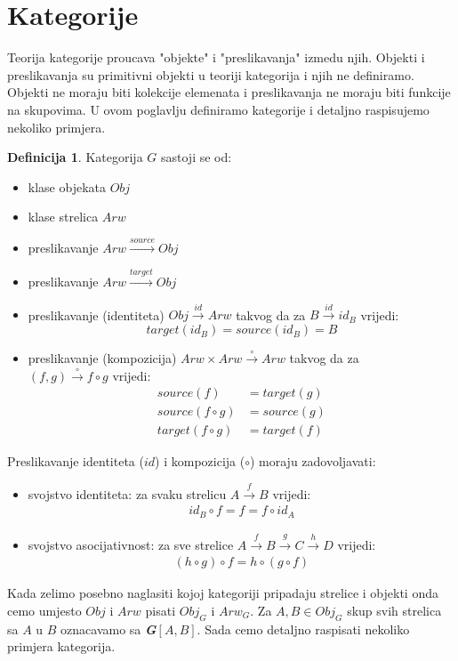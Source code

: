 \documentclass[11pt]{article}
\newcommand{\category}[1]{\textbf{\emph{#1}}}
\theoremstyle{definition}
\newtheorem{definition}{Definicija}
\begin{document}
  \section{Kategorije}
  Teorija kategorije proucava "objekte" i "preslikavanja" izmedu
  njih. Objekti i preslikavanja su primitivni objekti u teoriji kategorija i
  njih ne definiramo. Objekti ne moraju biti kolekcije elemenata i
  preslikavanja ne moraju biti funkcije na skupovima.
  U ovom poglavlju definiramo kategorije i detaljno raspisujemo nekoliko
  primjera.
  \begin{definition}
    Kategorija $G$ sastoji se od:
    \begin{itemize}
      \item klase objekata $Obj$
      \item klase strelica $Arw$
      \item preslikavanje $Arw \xrightarrow{source} Obj$
      \item preslikavanje $Arw \xrightarrow{target} Obj$
      \item preslikavanje (identiteta) $Obj \xrightarrow{id} Arw$ takvog da
      za $B \xrightarrow{id} id_B$ vrijedi:
        \begin{equation}
          target(id_B) = source(id_B) = B
        \end{equation}
      \item preslikavanje (kompozicija) $Arw \times Arw \xrightarrow{\circ}
      Arw$ takvog da za \\ $(f, g) \xrightarrow{\circ} f \circ g$ vrijedi:
        \begin{align}
          source(f) &= target(g) \\
          source(f \circ g) &= source(g) \\
          target(f \circ g) &= target(f)
        \end{align}
    \end{itemize}
    Preslikavanje identiteta ($id$) i kompozicija ($\circ$) moraju
    zadovoljavati:
    \begin{itemize}
      \item svojstvo identiteta: za svaku strelicu $A \xrightarrow{f} B$ vrijedi:
        \begin{align}
          id_B \circ f = f = f \circ id_A
        \end{align}
      \item svojstvo asocijativnost: za sve strelice $A \xrightarrow{f} B
      \xrightarrow{g} C \xrightarrow{h} D$ vrijedi:
        \begin{align} \label{def:kat_assoc}
          (h \circ g) \circ f = h \circ (g \circ f)
        \end{align}
    \end{itemize}
  \end{definition}
  Kada zelimo posebno naglasiti kojoj kategoriji pripadaju strelice i objekti
  onda cemo umjesto $Obj$ i $Arw$ pisati $Obj_G$ i $Arw_G$.
  Za $A, B \in Obj_G$ skup svih strelica sa $A$ u $B$ oznacavamo sa
  \category{G}$[A, B]$.
  Sada cemo detaljno raspisati nekoliko primjera kategorija.
\end{document}

